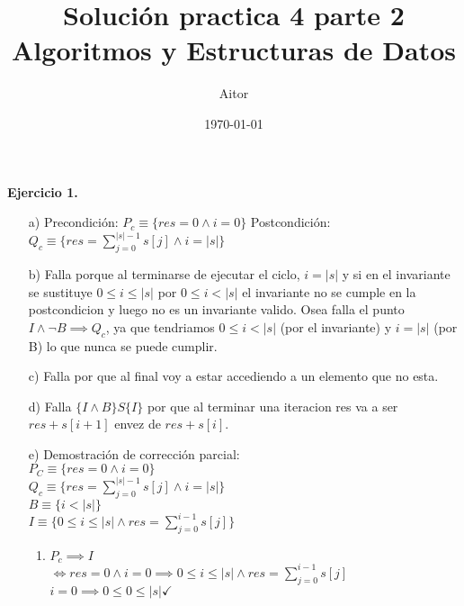 \documentclass{article}
\title{Soluci\'on practica 4 parte 2 Algoritmos y Estructuras de Datos}
\author{Aitor}
\date{\today}
\begin{document}
\maketitle

\newpage
\textbf{Ejercicio 1.}
\begin{itemize}
    \item [a)] Precondici\'on: $P_c \equiv \{res = 0 \land i = 0\}$
    Postcondici\'on: $Q_c \equiv \{res = \sum_{j=0}^{|s|-1} s[j] \land i = |s|\}$
    \item [b)] Falla porque al terminarse de ejecutar el ciclo, $i = |s|$ y si en el invariante se sustituye $0 \leq i \leq |s|$ por $0 \leq i < |s|$ el invariante no se cumple en la postcondicion y luego no es un invariante valido. Osea falla el punto $I \land \lnot B \implies Q_c$, ya que tendriamos $0 \leq i < |s|$ (por el invariante) y $i = |s|$ (por B) lo que nunca se puede cumplir.
    \item [c)] Falla por que al final voy a estar accediendo a un elemento que no esta.
    \item [d)] Falla $\{I \land B\}S\{I\}$ por que al terminar una iteracion res va a ser $res + s[i+1]$ envez de $res + s[i]$. 
    
    \item [e)] Demostraci\'on de correcci\'on parcial:\\
    $P_C \equiv \{res = 0 \land i = 0\}$\\
    $Q_c \equiv \{res = \sum_{j=0}^{|s|-1} s[j] \land i = |s|\}$\\
    $B \equiv \{i < |s|\}$\\
    $I \equiv \{0 \leq i \leq |s| \land res = \sum_{j=0}^{i-1} s[j]\}$

    \begin{enumerate}
        \item $P_c \implies I$\\ 
        $\iff res = 0 \land i = 0 \implies 0 \leq i \leq |s| \land res = \sum_{j=0}^{i-1} s[j]$
        $i = 0 \implies 0 \leq 0 \leq |s| \checkmark$


\end{enumerate}
\end{itemize}
\end{document}
